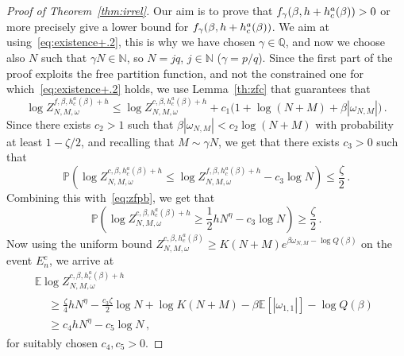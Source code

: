 \documentclass[11pt]{article}
\theoremstyle{definition}
\numberwithin{equation}{section}
\numberwithin{figure}{section}
\numberwithin{table}{section}
\newcommand{\tf}{\textsc{f}} %
\newcommand{\bbE}{\ensuremath{\mathbb{E}}}
\newcommand{\bbN}{\ensuremath{\mathbb{N}}}
\newcommand{\bbP}{\ensuremath{\mathbb{P}}}
\newcommand{\bbQ}{\ensuremath{\mathbb{Q}}}
\begin{document}
\begin{proof}[Proof of Theorem~\ref{thm:irrel}]
Our aim is to prove that $\tf_\gamma(\beta, h+ h_c^{a}(\beta)) >0$ or more precisely give a lower bound for $\tf_\gamma(\beta, h+ h_c^{a}(\beta))$. We aim at using~\eqref{eq:existence+.2}, this is why we have chosen $\gamma\in \bbQ$, and now we choose also $N$ such that $\gamma N \in \bbN$, so $N=jq$, $j\in \bbN$ ($\gamma=p/q$). Since the first part of the proof exploits the free partition function, and not the constrained one for which~\eqref{eq:existence+.2} holds, we use Lemma~\ref{th:zfc} that guarantees that
\begin{equation}\label{eq:zfc1}
\log Z^{f, \beta, h_c^a(\beta) +h}_{N,M,\omega} \le
\log Z^{c, \beta, h_c^a(\beta) +h}_{N,M,\omega} + c_1\big(1 + \log (N+M) + \beta | \omega_{N,M}| \big)\,.
\end{equation}
Since there exists $c_2 >1$ such that $\beta | \omega_{N,M}| < c_2 \log (N+M)$ with probability at least $1-\zeta/2$, and recalling that $M\sim \gamma N$, we get that there exists $c_3>0$ such that
\[
\bbP \left(\log Z^{c, \beta, h_c^a(\beta) +h}_{N,M,\omega} \le \log Z^{f, \beta, h_c^a(\beta) +h}_{N,M,\omega} - c_3 \log N \right) \leq \frac{\zeta}{2}\,.
\]
Combining this with~\eqref{eq:zfpb}, we get that
\begin{equation}\label{eq:hA}
\bbP \left(\log Z^{c, \beta, h_c^a(\beta) +h}_{N,M,\omega} \ge \frac{1}{2} h N^{ \eta} - c_3\log N \right) \ge \frac{\zeta}{2}
\,.
\end{equation}
Now using the uniform bound $Z^{c, \beta, h_c^a(\beta)}_{N,M,\omega} \ge K(N+M) e^{\beta \omega_{N,M} - \log Q(\beta) }$ on the event $E_n^c$, we arrive at
\begin{multline}\label{eq:irZ}
\bbE \log Z_{N,M,\omega}^{c,\beta,h_c^a(\beta)+h}\\
\begin{aligned}
& \ge \frac{\zeta}{4} h N^{\eta} - \frac{c_3\zeta}{2} \log N + \log K(N+M) - \beta \bbE [|\omega_{1,1}|] - \log Q(\beta) \\
& \ge c_4 h N^{\eta} - c_5\log N\,,
\end{aligned}
\end{multline}
for suitably chosen $c_4,c_5 >0$.




\end{proof}
\end{document}
